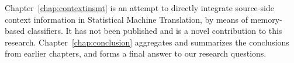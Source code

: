 {Chapter~\ref{chap:contextinsmt} is an attempt to directly integrate source-side
context information in Statistical Machine Translation, by means of
memory-based classifiers. It has not been published and is a novel contribution to this research. Chapter~\ref{chap:conclusion} aggregates and
summarizes the conclusions from earlier chapters, and forms a final answer to
our research questions.
}
